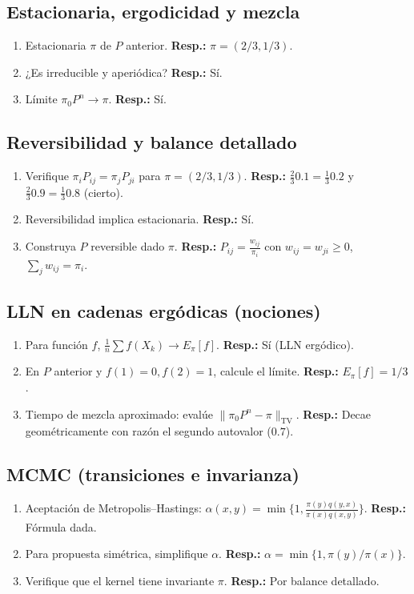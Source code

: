 	\subsection*{Estacionaria, ergodicidad y mezcla}
	\begin{enumerate}
		\item Estacionaria $\pi$ de $P$ anterior. \textbf{Resp.:} $\pi=(2/3,1/3)$.
		\item ¿Es irreducible y aperiódica? \textbf{Resp.:} Sí.
		\item Límite $\pi_0P^n\to\pi$. \textbf{Resp.:} Sí.
	\end{enumerate}
	
	\subsection*{Reversibilidad y balance detallado}
	\begin{enumerate}
		\item Verifique $\pi_i P_{ij}=\pi_j P_{ji}$ para $\pi=(2/3,1/3)$. \textbf{Resp.:} $\tfrac{2}{3}0.1=\tfrac{1}{3}0.2$ y $\tfrac{2}{3}0.9=\tfrac{1}{3}0.8$ (cierto).
		\item Reversibilidad implica estacionaria. \textbf{Resp.:} Sí.
		\item Construya $P$ reversible dado $\pi$. \textbf{Resp.:} $P_{ij}=\frac{w_{ij}}{\pi_i}$ con $w_{ij}=w_{ji}\ge0$, $\sum_j w_{ij}=\pi_i$.
	\end{enumerate}
	
	\subsection*{LLN en cadenas ergódicas (nociones)}
	\begin{enumerate}
		\item Para función $f$, $\frac1n\sum f(X_k)\to E_\pi[f]$. \textbf{Resp.:} Sí (LLN ergódico).
		\item En $P$ anterior y $f(1)=0,f(2)=1$, calcule el límite. \textbf{Resp.:} $E_\pi[f]=1/3$.
		\item Tiempo de mezcla aproximado: evalúe $\|\pi_0P^n-\pi\|_{\mathrm{TV}}$. \textbf{Resp.:} Decae geométricamente con razón el segundo autovalor ($0.7$).
	\end{enumerate}
	
	\subsection*{MCMC (transiciones e invarianza)}
	\begin{enumerate}
		\item Aceptación de Metropolis–Hastings: $\alpha(x,y)=\min\{1, \tfrac{\pi(y)q(y,x)}{\pi(x)q(x,y)}\}$. \textbf{Resp.:} Fórmula dada.
		\item Para propuesta simétrica, simplifique $\alpha$. \textbf{Resp.:} $\alpha=\min\{1,\pi(y)/\pi(x)\}$.
		\item Verifique que el kernel tiene invariante $\pi$. \textbf{Resp.:} Por balance detallado.
	\end{enumerate}
	
